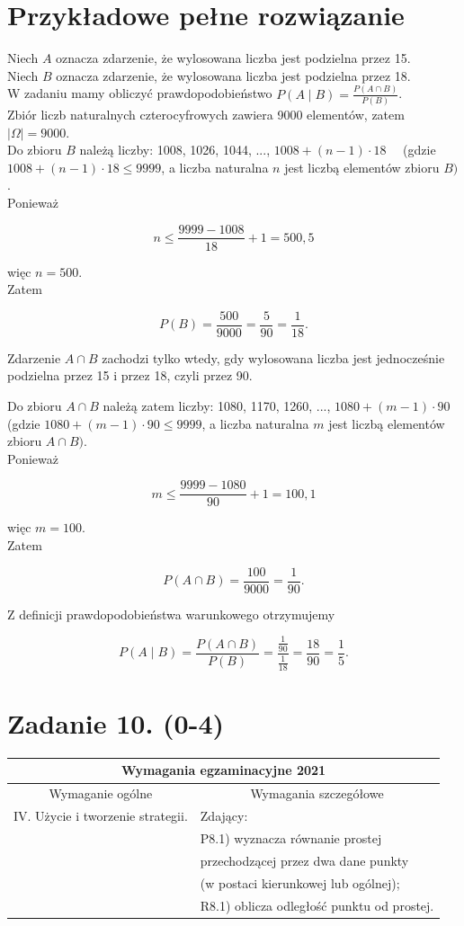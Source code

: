 \documentclass[10pt]{article}
\begin{document}
\section*{Przykładowe pełne rozwiązanie}
Niech $A$ oznacza zdarzenie, że wylosowana liczba jest podzielna przez 15.\\
Niech $B$ oznacza zdarzenie, że wylosowana liczba jest podzielna przez 18.\\
W zadaniu mamy obliczyć prawdopodobieństwo $P(A \mid B)=\frac{P(A \cap B)}{P(B)}$.\\
Zbiór liczb naturalnych czterocyfrowych zawiera 9000 elementów, zatem $|\Omega|=9000$.\\
Do zbioru $B$ należą liczby: 1008, 1026, 1044, ..., $1008+(n-1) \cdot 18 \quad$ (gdzie $1008+(n-1) \cdot 18 \leq 9999$, a liczba naturalna $n$ jest liczbą elementów zbioru $B)$.\\
Ponieważ

$$
n \leq \frac{9999-1008}{18}+1=500,5
$$

więc $n=500$.\\
Zatem

$$
P(B)=\frac{500}{9000}=\frac{5}{90}=\frac{1}{18} .
$$

Zdarzenie $A \cap B$ zachodzi tylko wtedy, gdy wylosowana liczba jest jednocześnie podzielna przez 15 i przez 18, czyli przez 90.

Do zbioru $A \cap B$ należą zatem liczby: 1080, 1170, 1260, ..., $1080+(m-1) \cdot 90$ (gdzie $1080+(m-1) \cdot 90 \leq 9999$, a liczba naturalna $m$ jest liczbą elementów zbioru $A \cap B)$.\\
Ponieważ

$$
m \leq \frac{9999-1080}{90}+1=100,1
$$

więc $m=100$.\\
Zatem

$$
P(A \cap B)=\frac{100}{9000}=\frac{1}{90} .
$$

Z definicji prawdopodobieństwa warunkowego otrzymujemy

$$
P(A \mid B)=\frac{P(A \cap B)}{P(B)}=\frac{\frac{1}{90}}{\frac{1}{18}}=\frac{18}{90}=\frac{1}{5} .
$$

\section*{Zadanie 10. (0-4)}
\begin{center}
\begin{tabular}{|l|l|}
\hline
\multicolumn{2}{|c|}{Wymagania egzaminacyjne 2021} \\
\hline
\multicolumn{1}{|c|}{Wymaganie ogólne} & \multicolumn{1}{|c|}{Wymagania szczegółowe} \\
\hline
IV. Użycie i tworzenie strategii. & Zdający: \\
 & P8.1) wyznacza równanie prostej \\
 & przechodzącej przez dwa dane punkty \\
 & (w postaci kierunkowej lub ogólnej); \\
 & R8.1) oblicza odległość punktu od prostej. \\
\hline
\end{tabular}
\end{center}
\end{document}
